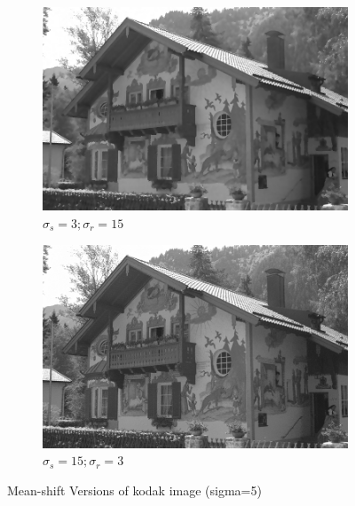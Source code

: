 \documentclass[12pt]{article}
\begin{document}
\begin{figure}[h]
\begin{subfigure}[b]{0.24\textwidth}
        \includegraphics[width=\textwidth]{../images/filtered_kodak24_meanshift_sigma_s_3_sigma_r_15.png}
        \caption{$\sigma_s=3;\sigma_r=15$}
        \label{fig:subfig3}
    \end{subfigure}
    \begin{subfigure}[b]{0.24\textwidth}
        \centering
        \includegraphics[width=\textwidth]{../images/filtered_kodak24_meanshift_sigma_s_15_sigma_r_3.png}
        \caption{$\sigma_s=15;\sigma_r=3$}
        \label{fig:subfig3}
    \end{subfigure}
    
    \caption{Mean-shift Versions of kodak image (sigma=5)}
    \label{fig:overall}
\end{figure}
\end{document}

